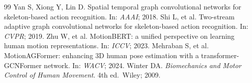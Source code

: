 \documentclass[preprint,12pt]{elsarticle}
\begin{document}
\begin{thebibliography}{99}
 Yan S, Xiong Y, Lin D. Spatial temporal graph convolutional networks for skeleton-based action recognition. In: \textit{AAAI}; 2018.
 Shi L, et al. Two-stream adaptive graph convolutional networks for skeleton-based action recognition. In: \textit{CVPR}; 2019.
 Zhu W, et al. MotionBERT: a unified perspective on learning human motion representations. In: \textit{ICCV}; 2023.
 Mehraban S, et al. MotionAGFormer: enhancing 3D human pose estimation with a transformer-GCNFormer network. In: \textit{WACV}; 2024.
 Winter DA. \textit{Biomechanics and Motor Control of Human Movement}. 4th ed.\ Wiley; 2009.
\end{thebibliography}
\end{document}
